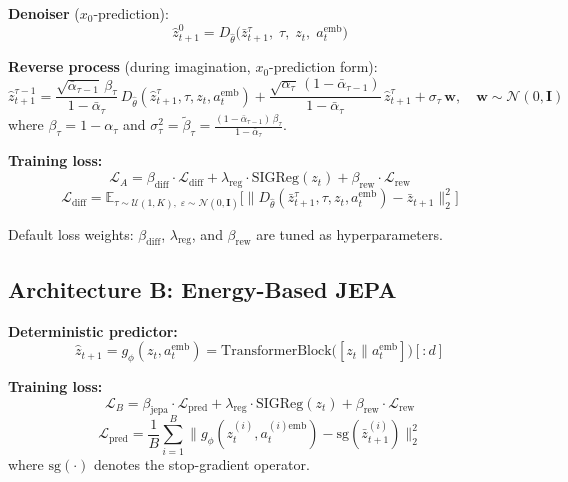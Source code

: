 \documentclass[12pt, a4paper]{article}
\begin{document}
\noindent \textbf{Denoiser} ($x_0$-prediction):
\begin{equation}
    \hat{z}_{t+1}^0 = D_{\hat{\theta}}\big(\bar{z}_{t+1}^{\tau},\; \tau,\; z_t,\; a_t^\text{emb}\big)
\end{equation}

\noindent \textbf{Reverse process} (during imagination, $x_0$-prediction form):
\begin{equation}
    \hat{z}_{t+1}^{\tau-1} = \frac{\sqrt{\bar{\alpha}_{\tau-1}}\,\beta_\tau}{1 - \bar{\alpha}_\tau}\,D_{\hat{\theta}}(\hat{z}_{t+1}^{\tau}, \tau, z_t, a_t^\text{emb}) + \frac{\sqrt{\alpha_\tau}\,(1 - \bar{\alpha}_{\tau-1})}{1 - \bar{\alpha}_\tau}\,\hat{z}_{t+1}^{\tau} + \sigma_\tau\,\mathbf{w}, \quad \mathbf{w} \sim \mathcal{N}(0, \mathbf{I})
\end{equation}
\noindent where $\beta_\tau = 1 - \alpha_\tau$ and $\sigma_\tau^2 = \tilde{\beta}_\tau = \frac{(1-\bar{\alpha}_{\tau-1})\,\beta_\tau}{1-\bar{\alpha}_\tau}$.

\noindent \textbf{Training loss:}
\begin{equation}
    \boxed{\mathcal{L}_A = \beta_\text{diff} \cdot \mathcal{L}_\text{diff} + \lambda_\text{reg} \cdot \text{SIGReg}(z_t) + \beta_\text{rew} \cdot \mathcal{L}_\text{rew}}
\end{equation}
\begin{equation}
    \mathcal{L}_\text{diff} = \mathbb{E}_{\tau \sim \mathcal{U}(1,K),\; \varepsilon \sim \mathcal{N}(0,\mathbf{I})}\Big[\big\|D_{\hat{\theta}}(\bar{z}_{t+1}^{\tau}, \tau, z_t, a_t^\text{emb}) - \bar{z}_{t+1}\big\|_2^2\Big]
\end{equation}

\noindent Default loss weights: $\beta_\text{diff}$, $\lambda_\text{reg}$, and $\beta_\text{rew}$ are tuned as hyperparameters.

\subsection{Architecture B: Energy-Based JEPA}

\noindent \textbf{Deterministic predictor:}
\begin{equation}
    \hat{z}_{t+1} = g_\phi(z_t, a_t^\text{emb}) = \text{TransformerBlock}\big([z_t \| a_t^\text{emb}]\big)[:d]
\end{equation}

\noindent \textbf{Training loss:}
\begin{equation}
    \boxed{\mathcal{L}_B = \beta_\text{jepa} \cdot \mathcal{L}_\text{pred} + \lambda_\text{reg} \cdot \text{SIGReg}(z_t) + \beta_\text{rew} \cdot \mathcal{L}_\text{rew}}
\end{equation}
\begin{equation}
    \mathcal{L}_\text{pred} = \frac{1}{B}\sum_{i=1}^{B} \big\|g_\phi(z_t^{(i)}, a_t^{(i)\text{emb}}) - \text{sg}(\bar{z}_{t+1}^{(i)})\big\|_2^2
\end{equation}
\noindent where $\text{sg}(\cdot)$ denotes the stop-gradient operator.
\end{document}
